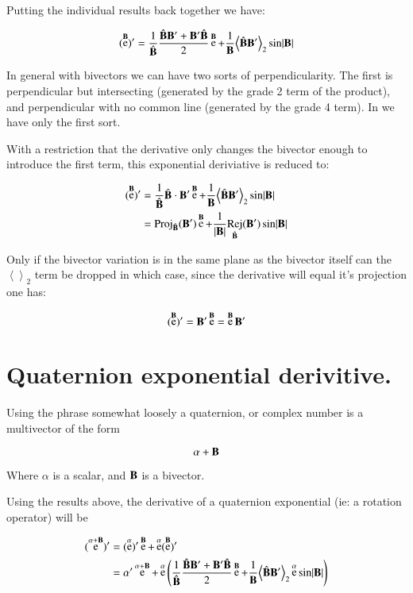 \documentclass{article}      %
\DeclareMathOperator{\Exp}{e}
\DeclareMathOperator{\Rej}{Rej}
\newcommand{\Bcap}[0]{\hat{\BB}}
\newcommand{\Babs}[0]{\abs{\BB}}
\newcommand{\gpgrade}[2] {{\left\langle{{#1}}\right\rangle}_{#2}}
\newcommand{\gpgradetwo}[1] {\gpgrade{#1}{2}}
\begin{document}
Putting the individual results back together we have:

\begin{equation}
(\Exp^{\BB})'
= \inv{\Bcap}\frac{\Bcap\BB' + \BB'\Bcap}{2} \Exp^{\BB} + \inv{\BB}\gpgradetwo{\Bcap\BB'} \sin\Babs 
\end{equation}

In general with bivectors we can have two sorts of perpendicularity.  The first is perpendicular but intersecting (generated by the grade 2 term of the product), and perpendicular with no common line (generated by the grade 4 term).
In  we have only the first sort.

With a restriction that the derivative only changes the bivector enough to introduce the first term, this
exponential deriviative is reduced to:

\begin{align*}
(\Exp^{\BB})'
&= \inv{\Bcap}\Bcap \cdot \BB' \Exp^{\BB} + \inv{\BB}\gpgradetwo{\Bcap\BB'} \sin\Babs \\
&= \Proj_{\Bcap}(\BB') \Exp^{\BB} + \inv{\Babs}{\Rej_{\Bcap}(\BB')} \sin\Babs \\
\end{align*}

Only if the bivector variation is in the same plane as the bivector itself can the $\gpgradetwo{}$ term be dropped
in which case, since the derivative will equal it's projection one has:

\begin{equation}
(\Exp^{\BB})' = \BB' \Exp^{\BB} = \Exp^{\BB} \BB' 
\end{equation}

\section{ Quaternion exponential derivitive. } 

Using the phrase somewhat loosely a quaternion, or complex number is a multivector of the form

\[
\alpha + \mathbf{B}
\]

Where $\alpha$ is a scalar, and $\mathbf{B}$ is a bivector.

Using the results above, the derivative of a quaternion exponential (ie: a rotation operator) will be

\begin{align*}
(\Exp^{\alpha + \BB})' 
&= (\Exp^{\alpha})' \Exp^{\BB} + \Exp^{\alpha} (\Exp^{\BB})' \\
&= \alpha' \Exp^{\alpha + \BB} + \Exp^{\alpha} 
\left(\inv{\Bcap}\frac{\Bcap\BB' + \BB'\Bcap}{2} \Exp^{\BB} + \inv{\BB}\gpgradetwo{\Bcap\BB'} \Exp^{\alpha} \sin\Babs \right) \\
\end{align*}
\end{document}
